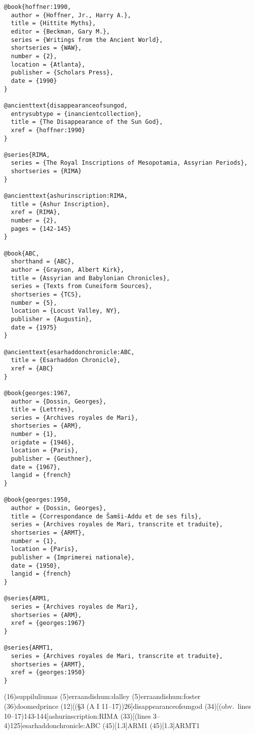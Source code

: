 \documentclass[a4paper]{article}
\begin{document}
\begin{verbatim}
@book{hoffner:1990,
  author = {Hoffner, Jr., Harry A.},
  title = {Hittite Myths},
  editor = {Beckman, Gary M.},
  series = {Writings from the Ancient World},
  shortseries = {WAW},
  number = {2},
  location = {Atlanta},
  publisher = {Scholars Press},
  date = {1990}
}

@ancienttext{disappearanceofsungod,
  entrysubtype = {inancientcollection},
  title = {The Disappearance of the Sun God},
  xref = {hoffner:1990}
}

@series{RIMA,
  series = {The Royal Inscriptions of Mesopotamia, Assyrian Periods},
  shortseries = {RIMA}
}

@ancienttext{ashurinscription:RIMA,
  title = {Ashur Inscription},
  xref = {RIMA},
  number = {2},
  pages = {142-145}
}

@book{ABC,
  shorthand = {ABC},
  author = {Grayson, Albert Kirk},
  title = {Assyrian and Babylonian Chronicles},
  series = {Texts from Cuneiform Sources},
  shortseries = {TCS},
  number = {5},
  location = {Locust Valley, NY},
  publisher = {Augustin},
  date = {1975}
}

@ancienttext{esarhaddonchronicle:ABC,
  title = {Esarhaddon Chronicle},
  xref = {ABC}
}

@book{georges:1967,
  author = {Dossin, Georges},
  title = {Lettres},
  series = {Archives royales de Mari},
  shortseries = {ARM},
  number = {1},
  origdate = {1946},
  location = {Paris},
  publisher = {Geuthner},
  date = {1967},
  langid = {french}
}

@book{georges:1950,
  author = {Dossin, Georges},
  title = {Correspondance de Šamši-Addu et de ses fils},
  series = {Archives royales de Mari, transcrite et traduite},
  shortseries = {ARMT},
  number = {1},
  location = {Paris},
  publisher = {Imprimerei nationale},
  date = {1950},
  langid = {french}
}

@series{ARM1,
  series = {Archives royales de Mari},
  shortseries = {ARM},
  xref = {georges:1967}
}

@series{ARMT1,
  series = {Archives royales de Mari, transcrite et traduite},
  shortseries = {ARMT},
  xref = {georges:1950}
}
\end{verbatim}

\examplecite[atrans](16){suppiluliumas}
\examplecite(5){erraandishum:dalley}
\examplecite(5){erraandishum:foster}
\examplecite(36){doomedprince}
\examplecite(12)[(§3 \mkbibparens{A I 11--17})26]{disappearanceofsungod}
\examplecite(34)[(obv.\ lines 10--17)143-144]{ashurinscription:RIMA}
\examplecite(33)[(lines 3--4)125]{esarhaddonchronicle:ABC}
\examplecite(45)[1.3]{ARM1}
\examplecite(45)[1.3]{ARMT1}
\exampleabbreviations
\examplebibliography
\end{document}
